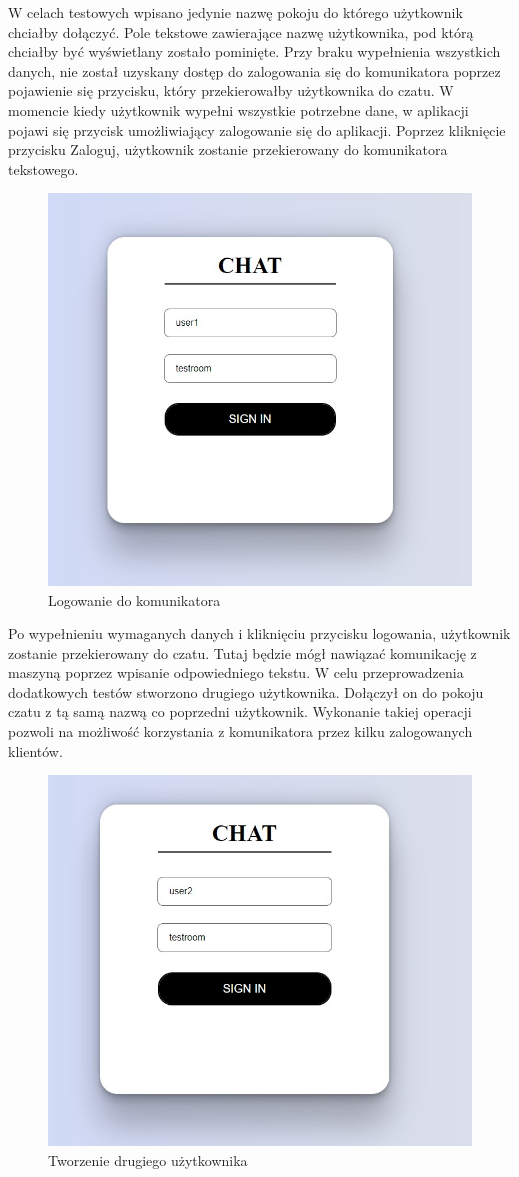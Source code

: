 \newpage
W celach testowych wpisano jedynie nazwę pokoju do którego użytkownik chciałby dołączyć. Pole tekstowe zawierające nazwę użytkownika, pod którą chciałby być wyświetlany zostało pominięte. Przy braku wypełnienia wszystkich danych, nie został uzyskany dostęp do zalogowania się do komunikatora poprzez pojawienie się przycisku, który przekierowałby użytkownika do czatu.
W momencie kiedy użytkownik wypełni wszystkie potrzebne dane, w aplikacji pojawi się przycisk umożliwiający zalogowanie się do aplikacji. Poprzez kliknięcie przycisku Zaloguj, użytkownik zostanie przekierowany do komunikatora tekstowego.

\begin{figure}[htbp]
	\centering
	\includegraphics[width=0.5\linewidth]{"obrazy/TESTdolaczenie"}
	\caption{Logowanie do komunikatora}
	\label{fig:41}
\end{figure}
Po wypełnieniu wymaganych danych i kliknięciu przycisku logowania, użytkownik zostanie przekierowany do czatu. Tutaj będzie mógł nawiązać komunikację z maszyną poprzez wpisanie odpowiedniego tekstu.
W celu przeprowadzenia dodatkowych testów stworzono drugiego użytkownika. Dołączył on do pokoju czatu z tą samą nazwą co poprzedni użytkownik. Wykonanie takiej operacji pozwoli na możliwość korzystania z komunikatora przez kilku zalogowanych klientów.
\newpage
\begin{figure}[htbp]
	\centering
	\includegraphics[width=0.5\linewidth]{"obrazy/TEST2uzytkownik"}
	\caption{Tworzenie drugiego użytkownika}
	\label{fig:43}
\end{figure}
